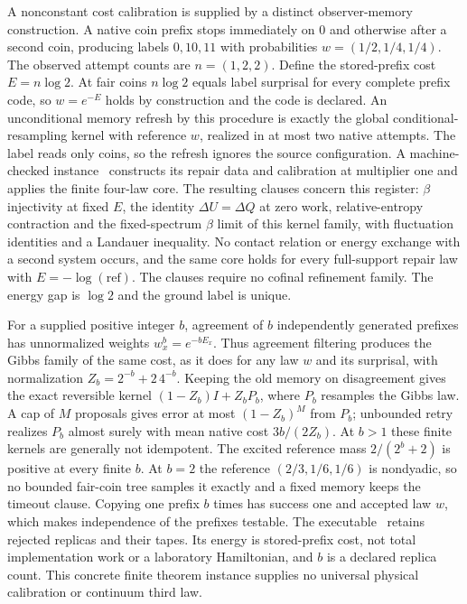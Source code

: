 \documentclass[11pt]{article}
\begin{document}
A nonconstant cost calibration is supplied by a distinct observer-memory
construction. A native coin prefix stops immediately on $0$ and otherwise
after a second coin, producing labels $0,10,11$ with probabilities
$w=(1/2,1/4,1/4)$. The observed attempt counts are $n=(1,2,2)$.
Define the stored-prefix cost $E=n\log2$. At fair coins $n\log2$ equals label
surprisal for every complete prefix code, so $w=e^{-E}$ holds by construction
and the code is declared. An unconditional memory refresh by this procedure is
exactly the global conditional-resampling kernel with reference $w$, realized
in at most two native attempts. The label reads only coins, so the refresh
ignores the source configuration.
A machine-checked instance~\cite{ophrepo} constructs its
repair data and calibration at multiplier one and applies the finite four-law
core. The resulting clauses concern this register:
$\beta$ injectivity at fixed $E$, the identity $\Delta U=\Delta Q$ at zero work,
relative-entropy contraction and the fixed-spectrum $\beta$ limit of this kernel
family, with fluctuation identities and a Landauer inequality. No contact
relation or energy exchange with a second system occurs, and the same core holds
for every full-support repair law with $E=-\log(\mathrm{ref})$. The clauses
require no cofinal refinement family. The energy gap is $\log2$ and the ground label is unique.

For a supplied positive integer $b$, agreement of $b$ independently generated
prefixes has unnormalized weights $w_x^b=e^{-bE_x}$. Thus agreement
filtering produces the Gibbs family of the same cost, as it does for any law
$w$ and its surprisal, with normalization
$Z_b=2^{-b}+2\,4^{-b}$. Keeping the old memory on disagreement gives the
exact reversible kernel $(1-Z_b)I+Z_bP_b$, where $P_b$ resamples the Gibbs
law. A cap of $M$ proposals gives error at most $(1-Z_b)^M$ from $P_b$;
unbounded retry realizes $P_b$ almost surely with mean native cost
$3b/(2Z_b)$. At $b>1$ these finite kernels are generally not idempotent. The
excited reference mass $2/(2^b+2)$ is positive at every finite $b$. At $b=2$ the
reference $(2/3,1/6,1/6)$ is nondyadic, so no bounded fair-coin tree samples it
exactly and a fixed memory keeps the timeout clause. Copying one prefix $b$
times has success one and accepted law $w$, which makes independence of the
prefixes testable. The executable~\cite{ophrepo} retains
rejected replicas and their tapes. Its energy is stored-prefix cost, not
total implementation work or a laboratory Hamiltonian, and $b$ is a declared
replica count. This concrete finite theorem instance supplies no universal
physical calibration or continuum third law.
\end{document}
